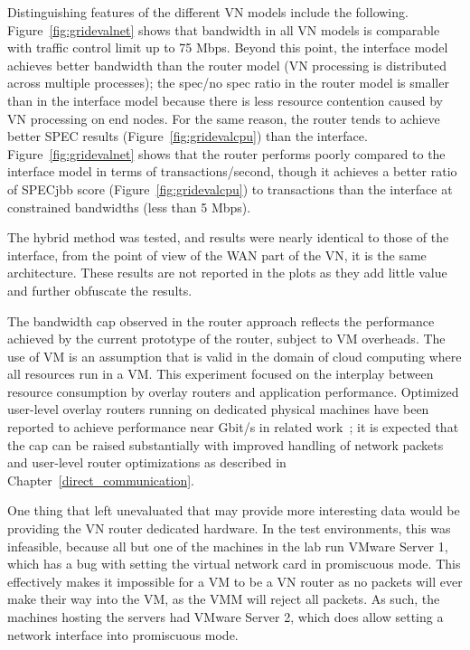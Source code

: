 Distinguishing features of the different VN models include the following.
Figure~\ref{fig:gridevalnet} shows that bandwidth in
all VN models is comparable with traffic control limit up to 75 Mbps. Beyond
this point, the interface model achieves better bandwidth than the router model
(VN processing is distributed across multiple processes); the spec/no spec
ratio in the router model is smaller than in the interface model because there
is less resource contention caused by VN processing on end nodes. For the same
reason, the router tends to achieve better SPEC results
(Figure~\ref{fig:gridevalcpu}) than the interface.
Figure~\ref{fig:gridevalnet} shows that the router
performs poorly compared to the interface model in terms of
transactions/second, though it achieves a better ratio of SPECjbb score
(Figure~\ref{fig:gridevalcpu}) to transactions than the 
interface at constrained bandwidths (less than 5 Mbps).

The hybrid method was tested, and results were nearly identical to those of the
interface, from the point of view of the WAN part of the VN, it is the
same architecture.  These results are not reported in the plots as they
add little value and further obfuscate the results.

The bandwidth cap observed in the router approach reflects the performance
achieved by the current prototype of the router, subject to VM overheads. The
use of VM is an assumption that is valid in the domain of cloud computing
where all resources run in a VM. This experiment focused on the interplay
between resource consumption by overlay routers and application performance.
Optimized user-level overlay routers running on dedicated physical
machines have been reported to achieve performance near Gbit/s in related
work~\cite{vine2}; it is expected that the cap can be raised substantially
with improved handling of network packets and user-level router optimizations
as described in Chapter~\ref{direct_communication}.

One thing that left unevaluated that may provide more interesting data would
be providing the VN router dedicated hardware.  In the test environments, this
was infeasible, because all but one of the machines in the lab run VMware
Server 1, which has a bug with setting the virtual network card in promiscuous
mode.  This effectively makes it impossible for a VM to be a VN router as no
packets will ever make their way into the VM, as the VMM will reject all
packets.  As such, the machines hosting the servers had VMware Server 2, which
does allow setting a network interface into promiscuous mode.

